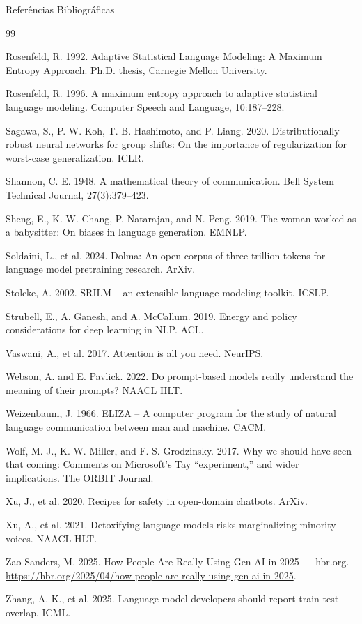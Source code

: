 \documentclass[aspectratio=169]{beamer}
\begin{document}
\begin{frame}[allowframebreaks]{Referências Bibliográficas}
\begin{thebibliography}{99}
{     Rosenfeld, R. 1992. Adaptive Statistical Language Modeling: A Maximum Entropy Approach. Ph.D. thesis, Carnegie Mellon University.
    
     Rosenfeld, R. 1996. A maximum entropy approach to adaptive statistical language modeling. Computer Speech and Language, 10:187–228.
    
     Sagawa, S., P. W. Koh, T. B. Hashimoto, and P. Liang. 2020. Distributionally robust neural networks for group shifts: On the importance of regularization for worst-case generalization. ICLR.
    
     Shannon, C. E. 1948. A mathematical theory of communication. Bell System Technical Journal, 27(3):379–423.
    
     Sheng, E., K.-W. Chang, P. Natarajan, and N. Peng. 2019. The woman worked as a babysitter: On biases in language generation. EMNLP.
    
     Soldaini, L., et al. 2024. Dolma: An open corpus of three trillion tokens for language model pretraining research. ArXiv.
    
     Stolcke, A. 2002. SRILM – an extensible language modeling toolkit. ICSLP.
    
     Strubell, E., A. Ganesh, and A. McCallum. 2019. Energy and policy considerations for deep learning in NLP. ACL.
    
     Vaswani, A., et al. 2017. Attention is all you need. NeurIPS.
    
     Webson, A. and E. Pavlick. 2022. Do prompt-based models really understand the meaning of their prompts? NAACL HLT.
    
     Weizenbaum, J. 1966. ELIZA – A computer program for the study of natural language communication between man and machine. CACM.
    
     Wolf, M. J., K. W. Miller, and F. S. Grodzinsky. 2017. Why we should have seen that coming: Comments on Microsoft’s Tay “experiment,” and wider implications. The ORBIT Journal.
    
     Xu, J., et al. 2020. Recipes for safety in open-domain chatbots. ArXiv.
    
     Xu, A., et al. 2021. Detoxifying language models risks marginalizing minority voices. NAACL HLT.
    
     Zao-Sanders, M. 2025. How People Are Really Using Gen AI in 2025 — hbr.org. \url{https://hbr.org/2025/04/how-people-are-really-using-gen-ai-in-2025}.
    
     Zhang, A. K., et al. 2025. Language model developers should report train-test overlap. ICML.
    
    }
    \end{thebibliography}
\end{frame}
\end{document}
